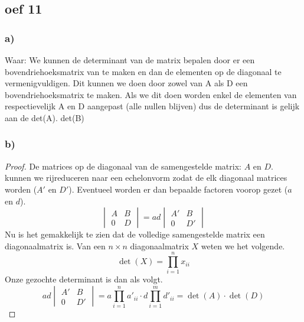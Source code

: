 \documentclass[lineaire_algebra_oplossingen.tex]{subfiles}
\begin{document}
\subsection{oef 11}
\subsubsection*{a)}
Waar: We kunnen de determinant van de matrix bepalen door er een bovendriehoeksmatrix van te maken en dan de elementen op de diagonaal te vermenigvuldigen. Dit kunnen we doen door zowel van A als D een bovendriehoeksmatrix te maken. Als we dit doen worden enkel de elementen van respectievelijk A en D aangepast (alle nullen blijven) dus de determinant is gelijk aan de det(A). det(B)

\subsubsection*{b)}
\begin{proof}
De matrices op de diagonaal van de samengestelde matrix: $A$ en $D$. kunnen we rijreduceren naar een echelonvorm zodat de elk diagonaal matrices worden ($A'$ en $D'$). Eventueel worden er dan bepaalde factoren voorop gezet ($a$ en $d$).
\[
\begin{vmatrix}
A & B\\
0 & D
\end{vmatrix}
=
ad
\begin{vmatrix}
A' & B\\
0 & D'
\end{vmatrix}
\]
Nu is het gemakkelijk te zien dat de volledige samengestelde matrix een diagonaalmatrix is.
Van een $n\times n$ diagonaalmatrix $X$ weten we het volgende.
\[
\det \left({X}\right) = \prod_{i \mathop = 1}^n x_{ii}
\]
Onze gezochte determinant is dan als volgt.
\[
ad
\begin{vmatrix}
A' & B\\
0 & D'
\end{vmatrix} = a\prod_{i \mathop = 1}^n a'_{ii} \cdot d \prod_{i \mathop = 1}^m d'_{ii} = \det \left({A}\right)\cdot\det \left({D}\right)
\]
\end{proof}
\end{document}
